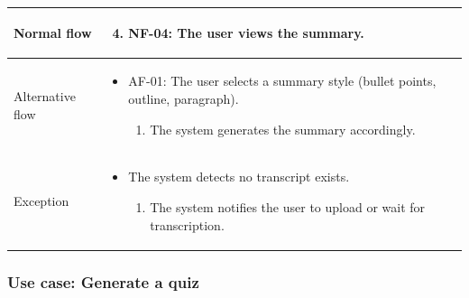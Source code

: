 \begin{table}[H]
    \begin{tabular}{|>{\raggedright\arraybackslash}p{}|>{\raggedright\arraybackslash}p{}|}
        \hline
        Normal flow &
        \begin{enumerate}
            \setcounter{enumi}{3}
            \item NF-04: The user views the summary.
        \end{enumerate} \\
        \hline
        Alternative flow &
        \begin{itemize}
            \item AF-01:  The user selects a summary style (bullet points, outline, paragraph).
            \begin{enumerate}
                \item The system generates the summary accordingly.
            \end{enumerate}
        \end{itemize} \\
        \hline
        Exception &
        \begin{itemize}
            \item The system detects no transcript exists.
            \begin{enumerate}
                \item The system notifies the user to upload or wait for transcription.
            \end{enumerate}
        \end{itemize}\\
        \hline
    \end{tabular}
\end{table}

\subsubsection{Use case: Generate a quiz}
\newpage

